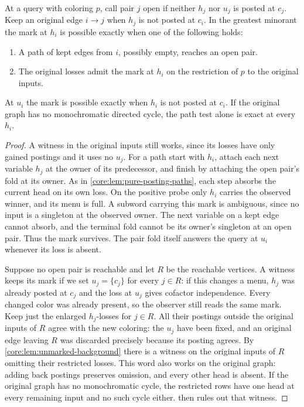 \begin{theorem}
\label{core:thm:reciprocal-pair-extension}
At a query with coloring $p$, call pair $j$ open if neither $h_j$
nor $u_j$ is posted at $c_j$. Keep an original edge $i\to j$ when
$h_j$ is not posted at $c_i$. In the greatest minorant the mark at
$h_i$ is possible exactly when one of the following holds:
\begin{enumerate}
\item A path of kept edges from $i$, possibly empty, reaches an open pair.
\item The original losses admit the mark at $h_i$ on the restriction
of $p$ to the original inputs.
\end{enumerate}
At $u_i$ the mark is possible exactly when $h_i$ is not posted at $c_i$.
If the original graph has no monochromatic directed cycle, the path
test alone is exact at every $h_i$.
\end{theorem}
\begin{proof}
A witness in the original inputs still works, since its losses have
only gained postings and it uses no $u_j$. For a path start with
$h_i$, attach each next variable $h_j$ at the owner of its predecessor,
and finish by attaching the open pair's fold at its owner. As in
\cref{core:lem:pure-posting-paths}, each step absorbs the current
head on its own loss. On the positive probe only $h_i$ carries the
observed winner, and its menu is full. A subword carrying this mark
is ambiguous, since no input is a singleton at the observed owner.
The next variable on a kept edge cannot absorb, and the terminal fold
cannot be its owner's singleton at an open pair. Thus the mark survives.
The pair fold itself answers the query at $u_i$ whenever its loss is absent.

Suppose no open pair is reachable and let $R$ be the reachable
vertices. A witness keeps its mark if we set $u_j=\{c_j\}$ for
every $j\in R$: if this changes a menu, $h_j$ was already posted at
$c_j$ and the loss at $u_j$ gives cofactor independence.
Every changed color was already present, so the observer still reads
the same mark. Keep just the enlarged $h_j$-losses for $j\in R$.
All their postings outside the original inputs of $R$ agree with the
new coloring: the $u_j$ have been fixed, and an original edge leaving
$R$ was discarded precisely because its posting agrees.
By \cref{core:lem:unmarked-background} there is a witness on the
original inputs of $R$ omitting their restricted losses. This word
also works on the original graph: adding back postings preserves
omission, and every other head is absent. If the original graph has
no monochromatic cycle, the restricted rows have one head at every
remaining input and no such cycle either.
 then rules out that witness.
\end{proof}

